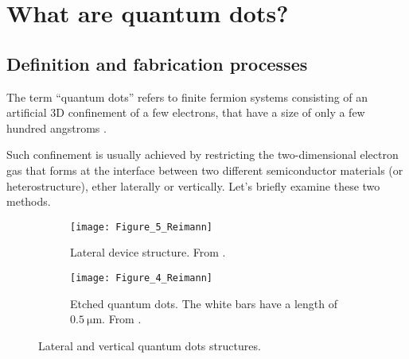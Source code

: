 
\graphicspath{{Mainmatter/figures/PNG/}{Mainmatter/figures/PDF/}{Mainmatter/figures/}}

\chapter{What are quantum dots?}

\section{Definition and fabrication processes}
The term ``quantum dots'' refers to finite fermion systems consisting of an artificial 3D confinement of a few electrons, that have a size of only a few hundred angstroms \citep{Reimann2002, Kastner1993}.

Such confinement is usually achieved by restricting the two-dimensional electron gas that forms at the interface between two different semiconductor materials (or heterostructure), ether laterally or vertically. Let's briefly examine these two methods.

\begin{figure}[H]
	\centering
	\begin{subfigure}[t]{0.5\textwidth}
		\texttt{[image: Figure\_5\_Reimann]}
		\caption{Lateral device structure. From \cite{Meirav1990}.}
		\label{fig:Figure_5_Reimann}
    \end{subfigure}
	\begin{subfigure}[t]{0.4\textwidth}
		\texttt{[image: Figure\_4\_Reimann]}
		\caption{Etched quantum dots. The white bars have a length of $\SI{0.5}{\micro\meter}$. From \cite{Reed1988}.}
		\label{fig:Figure_4_Reimann}
    \end{subfigure}
    \caption{Lateral and vertical quantum dots structures.}
	\label{fig:Figures_4-5_Reimann}
\end{figure}

